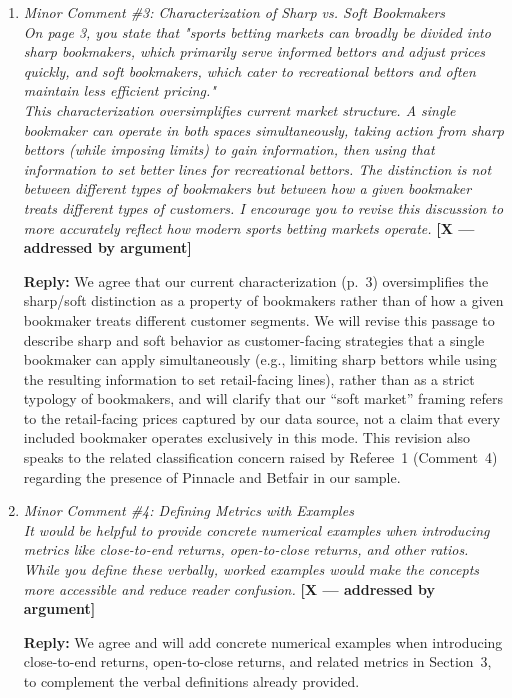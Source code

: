 \documentclass[letterpaper,12pt]{article}
\newcounter{b}
\newcommand{\argX}{\textcolor{green!55!black}{\textbf{[X --- addressed by argument]}}}
\newcommand{\Reply}[1]{\par\noindent\textbf{Reply:} #1}
\begin{document}
\begin{enumerate}
\item \textit{Minor Comment \#3: Characterization of Sharp vs. Soft Bookmakers\\[6pt]
On page 3, you state that "sports betting markets can broadly be divided into sharp bookmakers, which primarily serve informed bettors and adjust prices quickly, and soft bookmakers, which cater to recreational bettors and often maintain less efficient pricing."\\[6pt]
This characterization oversimplifies current market structure. A single bookmaker can operate in both spaces simultaneously, taking action from sharp bettors (while imposing limits) to gain information, then using that information to set better lines for recreational bettors. The distinction is not between different types of bookmakers but between how a given bookmaker treats different types of customers. I encourage you to revise this discussion to more accurately reflect how modern sports betting markets operate.} \argX

\Reply{We agree that our current characterization (p.~3) oversimplifies the sharp/soft distinction as a property of bookmakers rather than of how a given bookmaker treats different customer segments. We will revise this passage to describe sharp and soft behavior as customer-facing strategies that a single bookmaker can apply simultaneously (e.g., limiting sharp bettors while using the resulting information to set retail-facing lines), rather than as a strict typology of bookmakers, and will clarify that our ``soft market'' framing refers to the retail-facing prices captured by our data source, not a claim that every included bookmaker operates exclusively in this mode. This revision also speaks to the related classification concern raised by Referee~1 (Comment~4) regarding the presence of Pinnacle and Betfair in our sample.}

\item \textit{Minor Comment \#4: Defining Metrics with Examples\\[6pt]
It would be helpful to provide concrete numerical examples when introducing metrics like close-to-end returns, open-to-close returns, and other ratios. While you define these verbally, worked examples would make the concepts more accessible and reduce reader confusion.} \argX

\Reply{We agree and will add concrete numerical examples when introducing close-to-end returns, open-to-close returns, and related metrics in Section~3, to complement the verbal definitions already provided.}


\end{enumerate}
\end{document}
